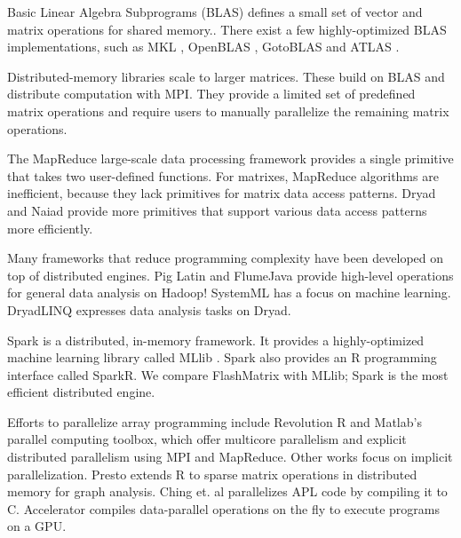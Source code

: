 Basic Linear Algebra Subprograms (BLAS) defines a small set of vector and
matrix operations for shared memory.. There exist a few
highly-optimized BLAS implementations, such as MKL \cite{mkl}, OpenBLAS
\cite{openblas}, GotoBLAS \cite{Goto} and ATLAS \cite{atlas}. 

Distributed-memory libraries \cite{trilinos, petsc, elemental}
scale to larger matrices. 
These build on BLAS and distribute computation with MPI.
They provide a limited set of predefined matrix operations and
require users to manually parallelize the remaining matrix operations.

The MapReduce \cite{mapreduce} large-scale data processing framework
provides a single primitive that takes two user-defined functions. 
For matrixes, MapReduce algorithms are inefficient, because they lack
primitives for matrix data access patterns.
Dryad \cite{dryad} and Naiad \cite{naiad} provide more primitives 
that support various data access patterns more efficiently.

Many frameworks that reduce programming complexity have been developed on top of distributed engines.
Pig Latin \cite{pig} and FlumeJava \cite{flumejava}
provide high-level operations for general data analysis on Hadoop!
SystemML \cite{systemml} has a focus on machine learning. 
DryadLINQ \cite{dryadlinq} expresses data analysis tasks on Dryad. 

Spark \cite{spark} is a distributed, in-memory framework.
It provides a highly-optimized machine learning library called MLlib \cite{mllib}.
Spark also provides an R programming interface called SparkR.  
We compare FlashMatrix with MLlib; Spark is the most efficient distributed engine.

Efforts to parallelize array programming include
Revolution R \cite{rre} and Matlab's parallel computing toolbox, which
offer multicore parallelism and explicit distributed parallelism using MPI and MapReduce. 
Other works focus on implicit parallelization.
Presto \cite{presto} extends R to sparse matrix operations in distributed memory for graph
analysis. Ching et. al \cite{Ching12} parallelizes APL code by
compiling it to C. Accelerator \cite{accelerator} compiles
data-parallel operations on the fly to execute programs on a GPU.
